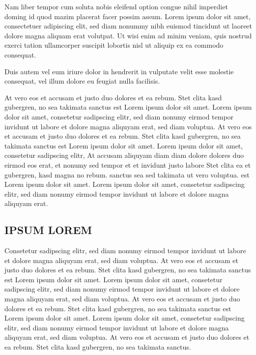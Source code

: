 \documentclass[]{../metanetpaper}
\begin{document}
Nam liber tempor cum soluta nobis eleifend option congue nihil imperdiet doming id quod mazim placerat facer possim assum. Lorem ipsum dolor sit amet, consectetuer adipiscing elit, sed diam nonummy nibh euismod tincidunt ut laoreet dolore magna aliquam erat volutpat. Ut wisi enim ad minim veniam, quis nostrud exerci tation ullamcorper suscipit lobortis nisl ut aliquip ex ea commodo consequat.   

Duis autem vel eum iriure dolor in hendrerit in vulputate velit esse molestie consequat, vel illum dolore eu feugiat nulla facilisis.   

At vero eos et accusam et justo duo dolores et ea rebum. Stet clita kasd gubergren, no sea takimata sanctus est Lorem ipsum dolor sit amet. Lorem ipsum dolor sit amet, consetetur sadipscing elitr, sed diam nonumy eirmod tempor invidunt ut labore et dolore magna aliquyam erat, sed diam voluptua. At vero eos et accusam et justo duo dolores et ea rebum. Stet clita kasd gubergren, no sea takimata sanctus est Lorem ipsum dolor sit amet. Lorem ipsum dolor sit amet, consetetur sadipscing elitr, At accusam aliquyam diam diam dolore dolores duo eirmod eos erat, et nonumy sed tempor et et invidunt justo labore Stet clita ea et gubergren, kasd magna no rebum. sanctus sea sed takimata ut vero voluptua. est Lorem ipsum dolor sit amet. Lorem ipsum dolor sit amet, consetetur sadipscing elitr, sed diam nonumy eirmod tempor invidunt ut labore et dolore magna aliquyam erat.   
\subsection{IPSUM LOREM}
Consetetur sadipscing elitr, sed diam nonumy eirmod tempor invidunt ut labore et dolore magna aliquyam erat, sed diam voluptua. At vero eos et accusam et justo duo dolores et ea rebum. Stet clita kasd gubergren, no sea takimata sanctus est Lorem ipsum dolor sit amet. Lorem ipsum dolor sit amet, consetetur sadipscing elitr, sed diam nonumy eirmod tempor invidunt ut labore et dolore magna aliquyam erat, sed diam voluptua. At vero eos et accusam et justo duo dolores et ea rebum. Stet clita kasd gubergren, no sea takimata sanctus est Lorem ipsum dolor sit amet. Lorem ipsum dolor sit amet, consetetur sadipscing elitr, sed diam nonumy eirmod tempor invidunt ut labore et dolore magna aliquyam erat, sed diam voluptua. At vero eos et accusam et justo duo dolores et ea rebum. Stet clita kasd gubergren, no sea takimata sanctus.   
\end{document}
